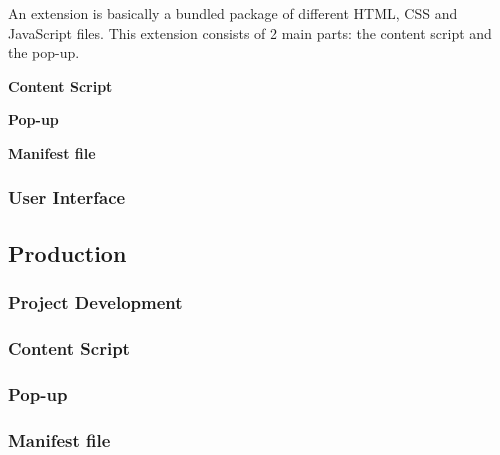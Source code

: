 \documentclass[conference,compsoc]{IEEEtran}
\begin{document}
An extension is basically a bundled package of different HTML, CSS and JavaScript files.
This extension consists of 2 main parts: the content script and the pop-up.

\vspace{0.4cm}
\textbf{Content Script}


\vspace{0.4cm}
\textbf{Pop-up}


\vspace{0.4cm}
\textbf{Manifest file}



\subsubsection{User Interface}




\subsection{Production}



\subsubsection{Project Development}

\subsubsection{Content Script}


\subsubsection{Pop-up}

\subsubsection{Manifest file}
\end{document}
